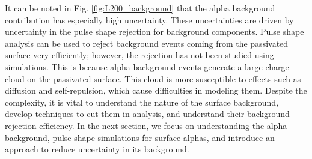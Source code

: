  It can be noted in Fig. \ref{fig:L200_background} that the alpha background contribution has especially high uncertainty. These uncertainties are driven by uncertainty in the pulse shape rejection for background components. Pulse shape analysis can be used to reject background events coming from the passivated surface very efficiently; however, the rejection has not been studied using simulations. This is because alpha background events generate a large charge cloud on the passivated surface. This cloud is more susceptible to effects such as diffusion and self-repulsion, which cause difficulties in modeling them. Despite the complexity, it is vital to understand the nature of the surface background, develop techniques to cut them in analysis, and understand their background rejection efficiency. In the next section, we focus on understanding the alpha background, pulse shape simulations for surface alphas, and introduce an approach to reduce uncertainty in its background.
